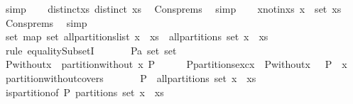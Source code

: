 \begin{isabellebody}
\ simp\isanewline
\isanewline
\ \ \isamarkupfalse%
\ distinct{\isacharunderscore}xs{\isacharcolon}\ {\isachardoublequoteopen}distinct\ xs{\isachardoublequoteclose}\ \isamarkupfalse%
\ Cons{\isachardot}prems\ \isamarkupfalse%
\ simp\isanewline
\ \ \isamarkupfalse%
\ x{\isacharunderscore}notin{\isacharunderscore}xs{\isacharcolon}\ {\isachardoublequoteopen}x\ {\isasymnotin}\ set\ xs{\isachardoublequoteclose}\ \isamarkupfalse%
\ Cons{\isachardot}prems\ \isamarkupfalse%
\ simp\isanewline
\ \ \isanewline
\ \ \isamarkupfalse%
\ {\isachardoublequoteopen}set\ {\isacharparenleft}map\ set\ {\isacharparenleft}all{\isacharunderscore}partitions{\isacharunderscore}list\ {\isacharparenleft}x\ {\isacharhash}\ xs{\isacharparenright}{\isacharparenright}{\isacharparenright}\ {\isacharequal}\ all{\isacharunderscore}partitions\ {\isacharparenleft}set\ {\isacharparenleft}x\ {\isacharhash}\ xs{\isacharparenright}{\isacharparenright}{\isachardoublequoteclose}\isanewline
\ \ \isamarkupfalse%
\ {\isacharparenleft}rule\ equalitySubsetI{\isacharparenright}\ \isanewline
\ \ \ \ \isamarkupfalse%
\ P{\isacharcolon}{\isacharcolon}{\isachardoublequoteopen}{\isacharprime}a\ set\ set{\isachardoublequoteclose}\ \isanewline
\ \ \ \ \isamarkupfalse%
\ {\isacharquery}P{\isacharunderscore}without{\isacharunderscore}x\ {\isacharequal}\ {\isachardoublequoteopen}partition{\isacharunderscore}without\ x\ P{\isachardoublequoteclose}\isanewline
\ \ \ \ \isamarkupfalse%
\ P{\isacharunderscore}partitions{\isacharunderscore}exc{\isacharunderscore}x{\isacharcolon}\ {\isachardoublequoteopen}{\isasymUnion}\ {\isacharquery}P{\isacharunderscore}without{\isacharunderscore}x\ {\isacharequal}\ {\isasymUnion}\ P\ {\isacharminus}\ {\isacharbraceleft}x{\isacharbraceright}{\isachardoublequoteclose}\ \isamarkupfalse%
\ partition{\isacharunderscore}without{\isacharunderscore}covers\ \isacommand{{\isachardot}}\isamarkupfalse%
\isanewline
\isanewline
\ \ \ \ \isamarkupfalse%
\ {\isachardoublequoteopen}P\ {\isasymin}\ all{\isacharunderscore}partitions\ {\isacharparenleft}set\ {\isacharparenleft}x\ {\isacharhash}\ xs{\isacharparenright}{\isacharparenright}{\isachardoublequoteclose}\isanewline
\ \ \ \ \isamarkupfalse%
\ \isamarkupfalse%
\ is{\isacharunderscore}partition{\isacharunderscore}of{\isacharcolon}\ {\isachardoublequoteopen}P\ partitions\ {\isacharparenleft}set\ {\isacharparenleft}x\ {\isacharhash}\ xs{\isacharparenright}{\isacharparenright}{\isachardoublequoteclose}\ \isamarkupfalse%

\end{isabellebody}
